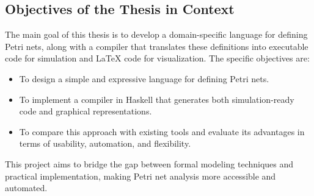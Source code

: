\documentclass[12pt]{article}
\begin{document}
    \subsection{Objectives of the Thesis in Context}
    The main goal of this thesis is to develop a domain-specific language for defining Petri nets, along with a compiler that translates these definitions into executable code for simulation and LaTeX code for visualization. The specific objectives are:
    \begin{itemize}
        \item To design a simple and expressive language for defining Petri nets.
        \item To implement a compiler in Haskell that generates both simulation-ready code and graphical representations.
        \item To compare this approach with existing tools and evaluate its advantages in terms of usability, automation, and flexibility.
    \end{itemize}
    This project aims to bridge the gap between formal modeling techniques and practical implementation, making Petri net analysis more accessible and automated.
\end{document}
